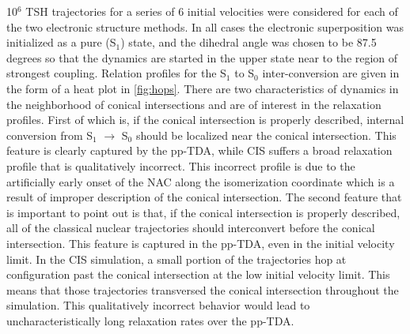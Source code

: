 \documentclass[12pt]{article}
\begin{document}
10$^6$ TSH trajectories for a series of 6 initial velocities were considered for
each of the two electronic structure methods.  In all cases the electronic
superposition was initialized as a pure (S$_1$) state, and the dihedral angle
was chosen to be 87.5 degrees so that the dynamics are started in the upper
state near to the region of strongest coupling. Relation profiles for the S$_1$
to S$_0$ inter-conversion are given in the form of a heat plot in
\cref{fig:hops}. There are two characteristics of dynamics in the neighborhood
of conical intersections and are of interest in the relaxation
profiles\cite{Hynes14_97}. First of which is, if the conical intersection is
properly described, internal conversion from S$_1$ $\rightarrow$ S$_0$ should be
localized near the conical intersection. This feature is clearly captured by
the pp-TDA, while CIS suffers a broad relaxation profile that is qualitatively
incorrect. This incorrect profile is due to the artificially early onset of the
NAC along the isomerization coordinate which is a result of improper description
of the conical intersection. The second feature that is important to point out
is that, if the conical intersection is properly described, all of the classical
nuclear trajectories should interconvert before the conical intersection. This
feature is captured in the pp-TDA, even in the initial velocity limit. In the
CIS simulation, a small portion of the trajectories hop at configuration past
the conical intersection at the low initial velocity limit. This means that
those trajectories transversed the conical intersection throughout the
simulation. This qualitatively incorrect behavior would lead to
uncharacteristically long relaxation rates over the pp-TDA.




\end{document}
